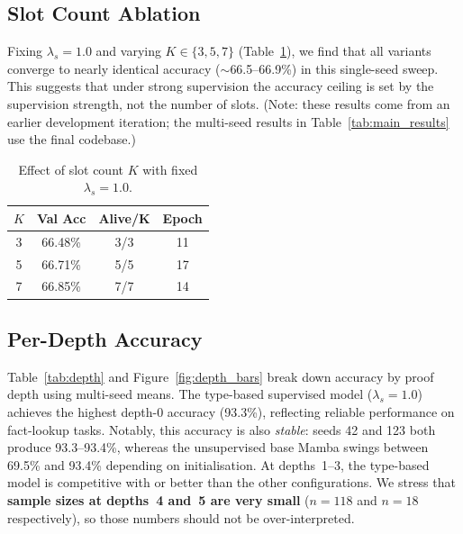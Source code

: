 \documentclass[conference]{IEEEtran}
\begin{document}
\subsection{Slot Count Ablation}
\label{sec:slot_count}

Fixing $\lambda_s=1.0$ and varying $K \in \{3, 5, 7\}$
(Table~\ref{tab:slot_count}), we find that all variants converge
to nearly identical accuracy ($\sim$66.5--66.9\%) in this
single-seed sweep. This suggests that under strong supervision
the accuracy ceiling is set by the supervision strength, not
the number of slots. (Note: these results come from an earlier
development iteration; the multi-seed results in
Table~\ref{tab:main_results} use the final codebase.)

\begin{table}[t]
\centering
\small
\caption{Effect of slot count $K$ with fixed $\lambda_s=1.0$.}
\label{tab:slot_count}
\begin{tabular}{@{}cccc@{}}
\toprule
$K$ & \textbf{Val Acc} & \textbf{Alive/K} & \textbf{Epoch} \\
\midrule
3 & 66.48\% & 3/3 & 11 \\
5 & 66.71\% & 5/5 & 17 \\
7 & 66.85\% & 7/7 & 14 \\
\bottomrule
\end{tabular}
\end{table}

\subsection{Per-Depth Accuracy}
\label{sec:depth}

Table~\ref{tab:depth} and Figure~\ref{fig:depth_bars} break down
accuracy by proof depth using multi-seed means. The type-based
supervised model ($\lambda_s{=}1.0$) achieves the highest depth-0
accuracy (93.3\%), reflecting reliable performance on fact-lookup
tasks. Notably, this accuracy is also \emph{stable}: seeds 42
and 123 both produce 93.3--93.4\%, whereas the unsupervised base
Mamba swings between 69.5\% and 93.4\% depending on
initialisation. At depths~1--3, the type-based model is
competitive with or better than the other configurations.
We stress that \textbf{sample sizes at depths~4 and~5 are
very small} ($n{=}118$ and $n{=}18$ respectively), so those
numbers should not be over-interpreted.
\end{document}
